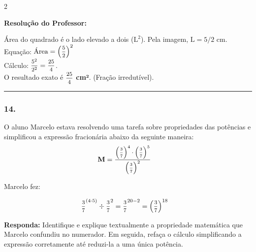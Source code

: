 \begin{multicols*}{2}
\ifgabarito
    \begin{tcolorbox}[colback=CorTitUm!5, colframe=CorTitUm, boxrule=1pt, arc=4pt, left=6pt, right=6pt, top=6pt, bottom=6pt]
    \small\textbf{\textcolor{CorTitUm}{Resolução do Professor:}}\par\vspace{0.1cm}
    \color{CinzaEscuro}
    Área do quadrado é o lado elevado a dois ($ \text{L}^{2} $).
    Pela imagem, $ \text{L} = 5/2 $ cm.\\
    Equação: $ \text{Área} = \left( \mfrac{5}{2} \right)^{2} $\\
    Cálculo: $ \mfrac{5^{2}}{2^{2}} = \mfrac{25}{4} $.\\
    O resultado exato é $ \mfrac{25}{4} $ \textbf{cm²}. (Fração irredutível).
    \end{tcolorbox}
\fi

\par\vspace{\espacoQuestao}

\noindent\textcolor{CorLinha}{\rule{\linewidth}{0.5pt}} 
\par\vspace{\espacoPreQuestao}
\subsubsection*{14.} O aluno Marcelo estava resolvendo uma tarefa sobre propriedades das potências e simplificou a expressão fracionária abaixo da seguinte maneira:
$$
\begin{aligned}
& \textbf{M} = \mfrac{ \left( \mfrac{3}{7} \right)^{4} \cdot \left( \mfrac{3}{7} \right)^{5} }{ \left( \mfrac{3}{7} \right)^{2} }
\end{aligned}
$$
\par\vspace{0.2em}
Marcelo fez:
\par\vspace{0.2em}
$$
\begin{aligned}
& \mfrac{3}{7}^{(4 \cdot 5)} \div \mfrac{3}{7}^{2} = \mfrac{3}{7}^{20 - 2} = \left( \mfrac{3}{7} \right)^{18}
\end{aligned}
$$
\begin{boxresponda}
\textbf{Responda:} Identifique e explique textualmente a propriedade matemática que Marcelo confundiu no numerador. Em seguida, refaça o cálculo simplificando a expressão corretamente até reduzi-la a uma única potência.
\end{boxresponda}


\end{multicols*}
